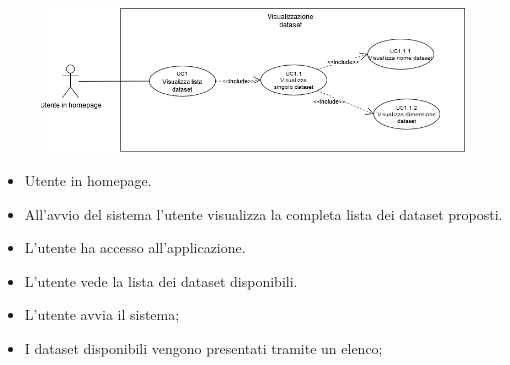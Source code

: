     \begin{figure}[h!]
        \centering
        \includegraphics[scale=0.55]{template/images/UC1.png}
        \caption{}
    \end{figure}
    \UCdsc
    { %
        \begin{itemize}
            \item Utente in homepage.
        \end{itemize}
    }
    { %
        \begin{itemize}
            \item All'avvio del sistema l'utente visualizza la completa lista dei dataset proposti.
        \end{itemize}
    }
    { %
        \begin{itemize}
            \item L'utente ha accesso all'applicazione.
        \end{itemize}
    }
    { %
        \begin{itemize}
            \item L'utente vede la lista dei dataset disponibili.
        \end{itemize}
    }
    { %
        \begin{itemize}
            \item L'utente avvia il sistema;
            \item I dataset disponibili vengono presentati tramite un elenco;
        \end{itemize}
    }


    \newpage

